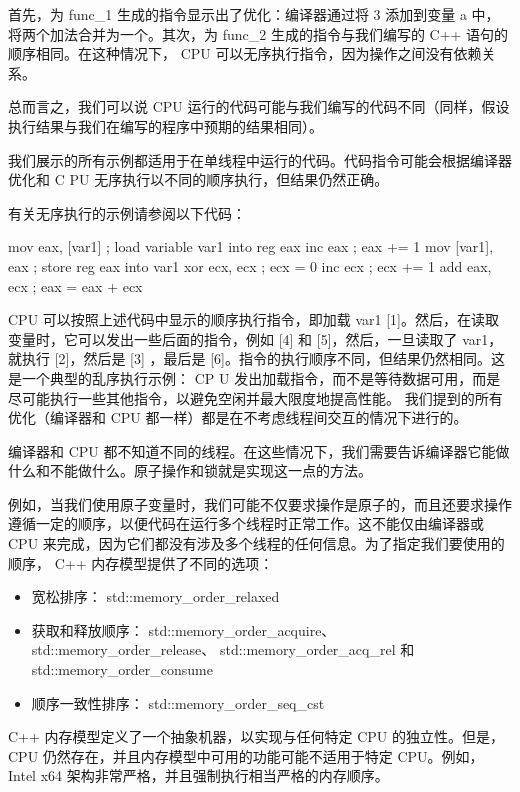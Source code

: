 首先，为 func\_1 生成的指令显示出了优化：编译器通过将 3 添加到变量 a 中，将两个加法合并为一个。其次，为 func\_2 生成的指令与我们编写的 C++ 语句的顺序相同。在这种情况下， CPU 可以无序执行指令，因为操作之间没有依赖关系。

总而言之，我们可以说 CPU 运行的代码可能与我们编写的代码不同（同样，假设执行结果与我们在编写的程序中预期的结果相同）。

我们展示的所有示例都适用于在单线程中运行的代码。代码指令可能会根据编译器优化和 C PU 无序执行以不同的顺序执行，但结果仍然正确。

有关无序执行的示例请参阅以下代码：

\begin{cpp}
mov eax, [var1] ; load variable var1 into reg eax
inc eax ; eax += 1
mov [var1], eax ; store reg eax into var1
xor ecx, ecx ; ecx = 0
inc ecx ; ecx += 1
add eax, ecx ; eax = eax + ecx
\end{cpp}

CPU 可以按照上述代码中显示的顺序执行指令，即加载 var1 [1]。然后，在读取变量时，它可以发出一些后面的指令，例如 [4] 和 [5]，然后，一旦读取了 var1，就执行 [2]，然后是 [3] ，最后是 [6]。指令的执行顺序不同，但结果仍然相同。这是一个典型的乱序执行示例： CP U 发出加载指令，而不是等待数据可用，而是尽可能执行一些其他指令，以避免空闲并最大限度地提高性能。
我们提到的所有优化（编译器和 CPU 都一样）都是在不考虑线程间交互的情况下进行的。

编译器和 CPU 都不知道不同的线程。在这些情况下，我们需要告诉编译器它能做什么和不能做什么。原子操作和锁就是实现这一点的方法。

例如，当我们使用原子变量时，我们可能不仅要求操作是原子的，而且还要求操作遵循一定的顺序，以便代码在运行多个线程时正常工作。这不能仅由编译器或 CPU 来完成，因为它们都没有涉及多个线程的任何信息。为了指定我们要使用的顺序， C++ 内存模型提供了不同的选项：

\begin{itemize}
\item
宽松排序： std::memory\_order\_relaxed

\item
获取和释放顺序： std::memory\_order\_acquire、 std::memory\_order\_release、 std::memory\_order\_acq\_rel 和 std::memory\_order\_consume

\item
顺序一致性排序： std::memory\_order\_seq\_cst
\end{itemize}

C++ 内存模型定义了一个抽象机器，以实现与任何特定 CPU 的独立性。但是， CPU 仍然存在，并且内存模型中可用的功能可能不适用于特定 CPU。例如， Intel x64 架构非常严格，并且强制执行相当严格的内存顺序。

